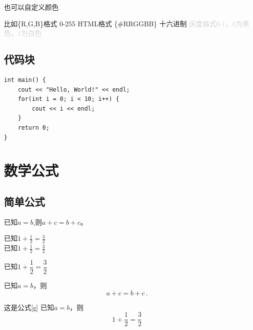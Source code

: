 \documentclass[draft,14pt]{extarticle}%
\begin{document}
也可以自定义颜色

\textcolor{myred}{比如\{R,G,B\}格式 0-255}
\textcolor{myblue}{HTML格式	\{\#RRGGBB\} 十六进制}%
\textcolor{lightgray}{灰度格式0-1，0为黑色，1为白色}

\subsection{代码块}
\begin{lstlisting}
int main() {
    cout << "Hello, World!" << endl;
    for(int i = 0; i < 10; i++) {
        cout << i << endl;
    }
    return 0;
}
\end{lstlisting}

\section{数学公式}
\subsection{简单公式}
已知$a=b$,则$a+c=b+c$。

已知$1+\frac{1}{2}=\frac{3}{2}$ \\[5pt]%
\indent 已知$\displaystyle 1+\frac{1}{2}=\frac{3}{2}$%

已知$1+\dfrac{1}{2}=\dfrac{3}{2}$%

已知$a=b$，则
\begin{equation}%
    a+c=b+c\,.%
    \label{e}
\end{equation}

这是公式\eqref{e}
已知$a=b$，则
\begin{equation*}%
    1+\frac{1}{2}=\frac{3}{2}%
\end{equation*}
\end{document}
